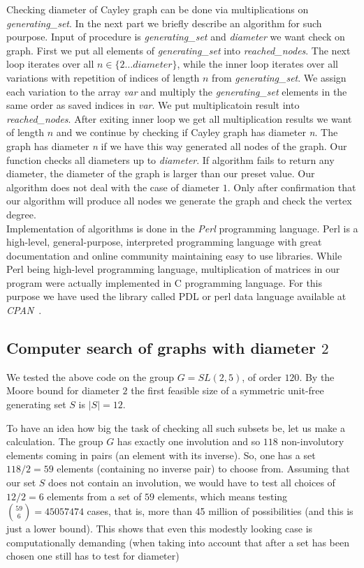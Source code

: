 \documentclass[a4paper,12pt,oneside]{report}%
\begin{document}
Checking diameter of Cayley graph can be done via multiplications on {\em generating\_set}. In the next part we briefly describe an algorithm for such pourpose. Input of procedure is {\em generating\_set} and {\em diameter} we want check on graph. First we put all elements of {\em generating\_set} into {\em reached\_nodes}. The next loop iterates over all $n \in \{2 \dots diameter\}$, while the inner loop iterates over all variations with repetition of indices of length $n$ from {\em generating\_set}. We assign each variation to the array {\em var} and multiply the {\em generating\_set} elements in the same order as saved indices in {\em var}. We put multiplicatoin result into {\em reached\_nodes}. After exiting inner loop we get all multiplication results we want of length $n$ and we continue by checking if Cayley graph has diameter {\em n}. The graph has diameter {\em n} if  we have this way generated  all nodes of the graph. Our function checks all diameters up to {\em diameter}. If algorithm fails to return any diameter, the diameter of the graph is larger than our preset value. Our algorithm does not deal with the case of diameter $1$. Only after confirmation that our algorithm will produce all nodes we generate the graph and check the vertex degree. ~\\




Implementation of algorithms is done in the {\em Perl} programming language. Perl is a high-level, general-purpose, interpreted programming language with great documentation and online community maintaining easy to use libraries. While Perl being high-level programming language, multiplication of matrices in our program were actually implemented in C programming language. For this purpose we have used the library called PDL or perl data language available at {\em CPAN}~\cite{CPAN}.

\subsection{Computer search of graphs with diameter $2$}

We tested the above code on the group $G=SL(2,5)$, of order $120$. By the Moore bound for diameter $2$ the first feasible size of a symmetric unit-free generating set $S$ is $|S|=12$.

To have an idea how big the task of checking all such subsets be, let us make a calculation. The group $G$ has exactly one involution and so $118$ non-involutory elements coming in pairs (an element with its inverse). So, one has a set $118/2=59$ elements (containing no inverse pair) to choose from. Assuming that our set $S$ does not contain an involution, we would have to test all choices of $12/2=6$ elements from a set of $59$ elements, which means testing ${59 \choose 6} = 45057474 $ cases, that is, more than 45 million of possibilities (and this is just a lower bound). This shows that even this modestly looking case is computationally demanding (when taking into account that after a set has been chosen one still has to test for diameter)
\end{document}
